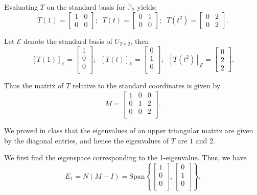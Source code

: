 \documentclass[12pt,letterpaper]{article}
\begin{document}
\begin{enumerate}
					
\Answer Evaluating $T$ on the standard basis for $\mathbb{P}_2$ yields: 
$$T\left(1 \right) = \begin{bmatrix} 1 & 0\\ 0 & 0\end{bmatrix};  \; \;
T\left( t \right) = \begin{bmatrix} 0 & 1\\ 0 & 0\end{bmatrix}; \; \;
T\left( t^2 \right) = \begin{bmatrix} 0 & 2\\ 0 & 2\end{bmatrix}.$$

Let $\mathcal{E}$ denote the standard basis of $U_{2 \times 2}$, then 
$$[T\left(1 \right)]_{\mathcal{E}} = \begin{bmatrix} 1\\ 0\\  0\\\end{bmatrix};  \; \;
[T\left( t \right)]_{\mathcal{E}} = \begin{bmatrix} 0 \\ 1\\ 0\\\end{bmatrix}; \; \;
[T\left( t^2 \right)]_{\mathcal{E}} = \begin{bmatrix} 0 \\ 2 \\ 2\end{bmatrix}.$$

Thus the matrix of $T$ relative to the standard coordinates is given by
$$M=\begin{bmatrix}
1 & 0 & 0\\
0 & 1 & 2\\
0 & 0 & 2\\
\end{bmatrix}.$$

We proved in class that the eigenvalues of an upper triangular matrix are given by the diagonal entries, and hence the eigenvalues of $T$ are $1$ and $2$.

We first find the eigenspace corresponding to the 1-eigenvalue.  Thus, we have
$$E_1 = N(M- I)= \text{Span}\left\{  \begin{bmatrix} 1\\0\\0\\\end{bmatrix}, \begin{bmatrix} 0\\1\\0\\\end{bmatrix}\right\}.$$


\end{enumerate}
\end{document}
